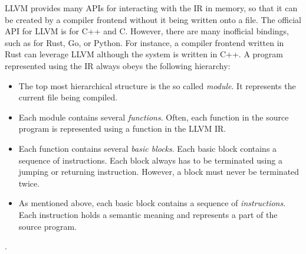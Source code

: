 LLVM provides many APIs for interacting with the IR in memory, so that it can be created by a compiler frontend without it being written onto a file.
The official API for LLVM is for C++ and C.
However, there are many inofficial bindings, such as for Rust, Go, or Python.
For instance, a compiler frontend written in Rust can leverage LLVM although the system is written in C++.
A program represented using the IR always obeys the following hierarchy: 

\begin{itemize}
    \item The top most hierarchical structure is the so called \emph{module}.
    It represents the current file being compiled.
    \item Each module contains several \emph{functions}.
    Often, each function in the source program is represented using a function in the LLVM IR.
    \item Each function contains several \emph{basic blocks}.
    Each basic block contains a sequence of instructions.
    Each block always has to be terminated using a jumping or returning instruction.
    However, a block must never be terminated twice.
    \item As mentioned above, each basic block contains a sequence of \emph{instructions}.
    Each instruction holds a semantic meaning and represents a part of the source program.
\end{itemize} \cite[p.~211-213]{Hsu2021-ez}.





